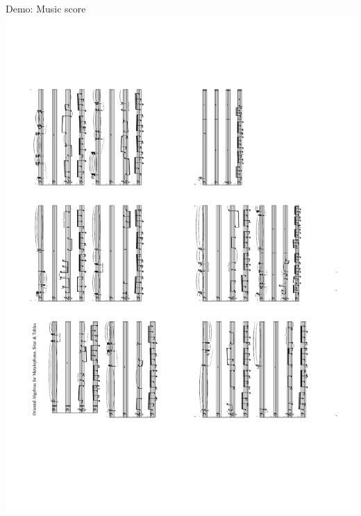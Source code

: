 \documentclass{beamer}
\begin{document}
	\begin{frame}{Demo: Music score}
	\vspace{-.5cm}
	\includegraphics[scale=.42,angle=-90]{oriental.pdf}
	\end{frame}
  	
\end{document}
